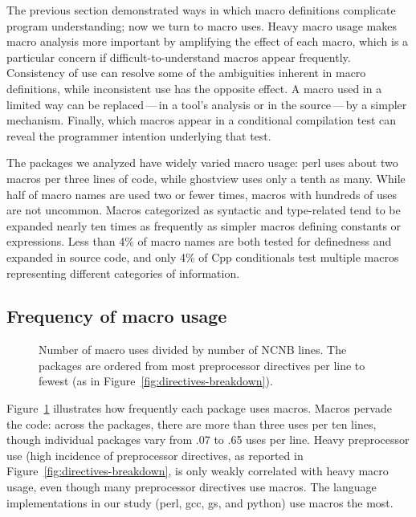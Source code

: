 \documentclass[10pt]{article}
\newcommand{\pkg}[1]{\textsf{#1}}
\newcommand{\captionsmall}[1]{\caption[]{\small #1}}
\begin{document}
The previous section demonstrated ways in which macro definitions
complicate program understanding; now we turn to macro uses.  Heavy macro
usage makes macro analysis more important by amplifying the effect of each
macro, which is a particular concern if difficult-to-understand macros
appear frequently.  Consistency of use can resolve some of the ambiguities
inherent in macro definitions, while inconsistent use has the opposite
effect.  A macro used in a limited way can be replaced\,---\,in a tool's
analysis or in the source\,---\,by a simpler mechanism.  Finally, which
macros appear in a conditional compilation test can reveal the programmer
intention underlying that test.

The packages we analyzed have widely varied macro usage: \pkg{perl} uses
about two macros per three lines of code, while \pkg{ghostview} uses only a
tenth as many.  While half of macro names are used two or fewer times,
macros with hundreds of uses are not uncommon.  Macros categorized as
syntactic and type-related tend to be expanded nearly ten times as
frequently as simpler macros defining constants or expressions.  Less than
4\% of macro names are both tested for definedness and expanded in source
code, and only 4\% of Cpp conditionals test multiple macros representing
different categories of information.


\subsection{Frequency of macro usage}

\begin{figure}
\centerline{}
\captionsmall{Number of macro uses divided by number of NCNB lines.
  The packages are ordered from most preprocessor directives per line to
  fewest (as in Figure~\ref{fig:directives-breakdown}).}
\label{fig:use-per-line}
\end{figure}

Figure~\ref{fig:use-per-line} illustrates how frequently each package uses
macros.  Macros pervade the code: across the packages, there are more than
three uses per ten lines, though individual packages vary from .07 to .65
uses per line.  Heavy preprocessor use (high incidence of preprocessor
directives, as reported in Figure~\ref{fig:directives-breakdown}, is only
weakly correlated with heavy macro usage, even though many preprocessor
directives use macros.  The language implementations in our study
(\pkg{perl}, \pkg{gcc}, \pkg{gs}, and \pkg{python}) use macros the most.
\end{document}
